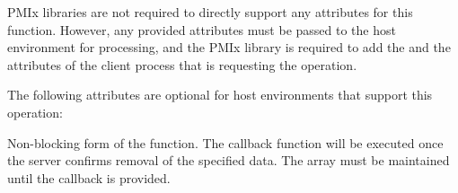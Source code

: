 \reqattrstart
\ac{PMIx} libraries are not required to directly support any attributes for this function. However, any provided attributes must be passed to the host environment for processing, and the \ac{PMIx} library is required to add the  and the  attributes of the client process that is requesting the operation.

\reqattrend

\optattrstart
The following attributes are optional for host environments that support this operation:


\optattrend

\descr

Non-blocking form of the  function.
The callback function will be executed once the server confirms removal of the specified data. The  array must be maintained until the callback is provided.


